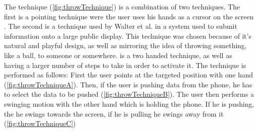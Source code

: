 \begin{figure}[H]
	\label{fig:swipeTechnique}
\end{figure}

The \throw technique (\cref{fig:throwTechnique}) is a combination of two techniques.
The first is a pointing technique were the user uses his hands as a cursor on the screen .
The second is a technique used by Walter et al.  in a system used to submit information onto a large public display.
This technique was chosen because of it's natural and playful design, as well as mirroring the idea of throwing something, like a ball, to someone or somewhere.
\throw is a two handed technique, as well as having a larger number of steps to take in order to activate it.
The \throw technique is performed as follows: 
First the user points at the targeted position with one hand (\cref{fig:throwTechniqueA}).
Then, if the user is pushing data from the phone, he has to select the data to be pushed (\cref{fig:throwTechniqueB}).
The user then performs a swinging motion with the other hand which is holding the phone.
If he is pushing, the he swings towards the screen, if he is pulling he swings away from it (\cref{fig:throwTechniqueC}) 


